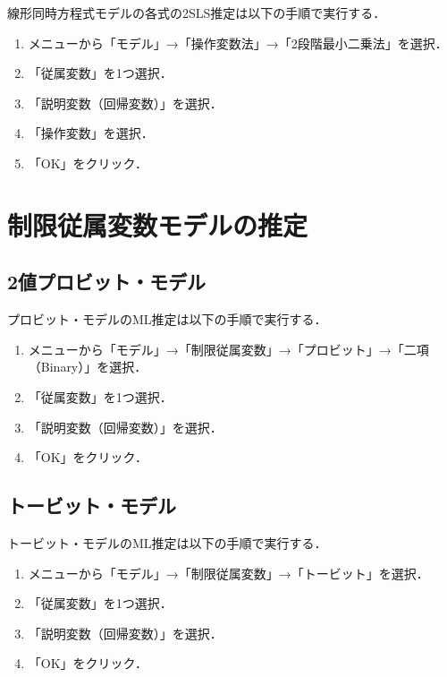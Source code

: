 \documentclass[
]{jlreq}
\providecommand{\tightlist}{%
  \setlength{\itemsep}{0pt}\setlength{\parskip}{0pt}}
\begin{document}
線形同時方程式モデルの各式の2SLS推定は以下の手順で実行する．

\begin{enumerate}
\def\labelenumi{\arabic{enumi}.}
\tightlist
\item
  メニューから「モデル」→「操作変数法」→「2段階最小二乗法」を選択．
\item
  「従属変数」を1つ選択．
\item
  「説明変数（回帰変数）」を選択．
\item
  「操作変数」を選択．
\item
  「OK」をクリック．
\end{enumerate}

\section{制限従属変数モデルの推定}\label{ux5236ux9650ux5f93ux5c5eux5909ux6570ux30e2ux30c7ux30ebux306eux63a8ux5b9a}

\subsection{2値プロビット・モデル}\label{ux5024ux30d7ux30edux30d3ux30c3ux30c8ux30e2ux30c7ux30eb}

プロビット・モデルのML推定は以下の手順で実行する．

\begin{enumerate}
\def\labelenumi{\arabic{enumi}.}
\tightlist
\item
  メニューから「モデル」→「制限従属変数」→「プロビット」→「二項（Binary）」を選択．
\item
  「従属変数」を1つ選択．
\item
  「説明変数（回帰変数）」を選択．
\item
  「OK」をクリック．
\end{enumerate}

\subsection{トービット・モデル}\label{ux30c8ux30fcux30d3ux30c3ux30c8ux30e2ux30c7ux30eb}

トービット・モデルのML推定は以下の手順で実行する．

\begin{enumerate}
\def\labelenumi{\arabic{enumi}.}
\tightlist
\item
  メニューから「モデル」→「制限従属変数」→「トービット」を選択．
\item
  「従属変数」を1つ選択．
\item
  「説明変数（回帰変数）」を選択．
\item
  「OK」をクリック．
\end{enumerate}
\end{document}
